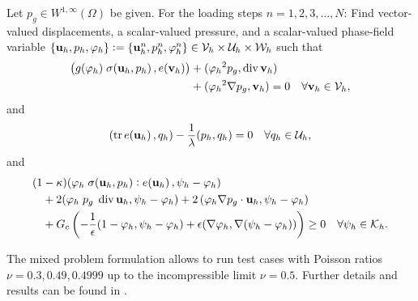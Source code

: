 \begin{Problem}\label{form_mixed_h}
Let $p_g\in W^{1,\infty}(\Omega)$ be given. 
For the loading steps $n=1,2,3,\ldots, N$: Find vector-valued displacements,
a scalar-valued pressure, 
and a
scalar-valued phase-field variable 
$\{\mathbf{u}_h,p_h,\varphi_h\} := \{\mathbf{u}_h^n,p_h^n,\varphi_h^n\} \in \mathcal{V}_h \times \mathcal{U}_h \times \mathcal{W}_h$ such that
\begin{equation}\label{eq_u_mixed_disc}
\begin{aligned}
\left(g(\varphi_h)\;\sigma(\mathbf{u}_h,p_h)\,, e( \mathbf{v}_h)\right)  
&+({\varphi_h}^{2} p_g, \operatorname{div}  \mathbf{v}_h) \\
&+ ({\varphi_h}^{2} \nabla p_g,  \mathbf{v}_h) 
=0 \quad \forall \mathbf{v}_h\in \mathcal{V}_h ,
\end{aligned}
\end{equation}
and 
\begin{equation}\label{eq_p_mixed_disc}
\begin{aligned}
(\operatorname{tr}e(\mathbf{u}_h)\,, q_h) - \frac{1}{\lambda} (p_h,q_h)
=0 \quad \forall q_h\in \mathcal{U}_h,
\end{aligned}
\end{equation}
and
\begin{equation} \label{eq_varphi_mixed_disc}
\begin{aligned}
 (1&-\kappa) (\varphi_h \;\sigma(\mathbf{u}_h,p_h):e( \mathbf{u}_h)\,, \psi_h -\varphi_h) \\
&+  2 (\varphi_h\;  p_g\; \operatorname{div}  \mathbf{u}_h,\psi_h-\varphi_h)
+ 2\, (\varphi_h \nabla p_g\cdot  \mathbf{u}_h,\psi_h-\varphi_h) 
\\
&+  G_c  \left( -\frac{1}{\epsilon} (1-\varphi_h,\psi_h-\varphi_h) + \epsilon (\nabla
\varphi_h, \nabla (\psi_h - \varphi_h))   \right)  \geq  0
\quad \forall \psi_h \in \mathcal{K}_h.
\end{aligned}
\end{equation}
\end{Problem}

The mixed problem formulation allows to run test cases with Poisson ratios $\nu=0.3, 0.49, 0.4999$ up to the incompressible limit $\nu=0.5$. 
Further details and results can be found in \cite{BasavaMangWallothWickWollner:2020}.
%


